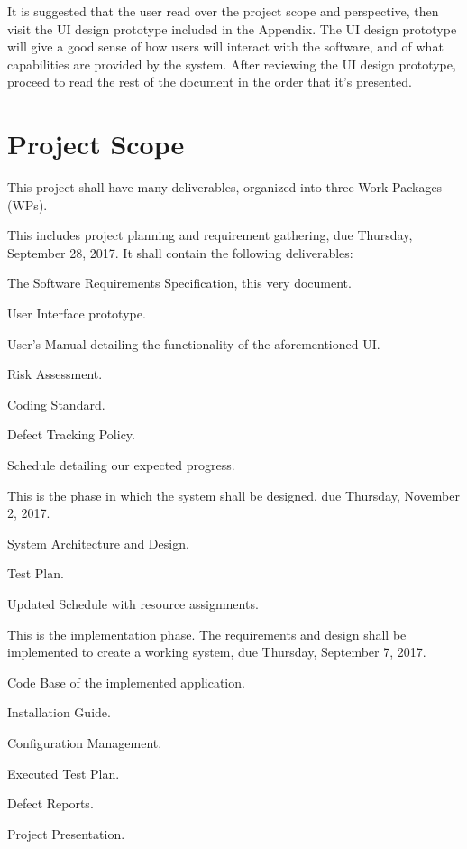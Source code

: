 \documentclass{scrreprt}
\begin{document}
It is suggested that the user read over the project scope and perspective, then
visit the UI design prototype included in the Appendix. The UI design prototype
will give a good sense of how users will interact with the software, and of what
capabilities are provided by the system. After reviewing the UI design prototype,
proceed to read the rest of the document in the order that it's presented.

\section{Project Scope}
This project shall have many deliverables, organized into three Work Packages (WPs).

\begin{numonly}[label=\textbf{WP \arabic*.}]
    \item This includes project planning and requirement gathering, due Thursday, September 28, 2017.
    It shall contain the following deliverables:
    \begin{numonly}
        \item The Software Requirements Specification, this very document.
        \item User Interface prototype.
        \item User's Manual detailing the functionality of the aforementioned UI.
        \item Risk Assessment.
        \item Coding Standard.
        \item Defect Tracking Policy.
        \item Schedule detailing our expected progress.
    \end{numonly}

    \item This is the phase in which the system shall be designed, due Thursday, November 2, 2017.
    \begin{numonly}
        \item System Architecture and Design.
        \item Test Plan.
        \item Updated Schedule with resource assignments.
    \end{numonly}

    \item This is the implementation phase. The requirements and design shall be implemented to create a working system, due Thursday, September 7, 2017.
    \begin{numonly}
        \item Code Base of the implemented application.
        \item Installation Guide.
        \item Configuration Management.
        \item Executed Test Plan.
        \item Defect Reports.
        \item Project Presentation.
    \end{numonly}
\end{numonly}
\end{document}
